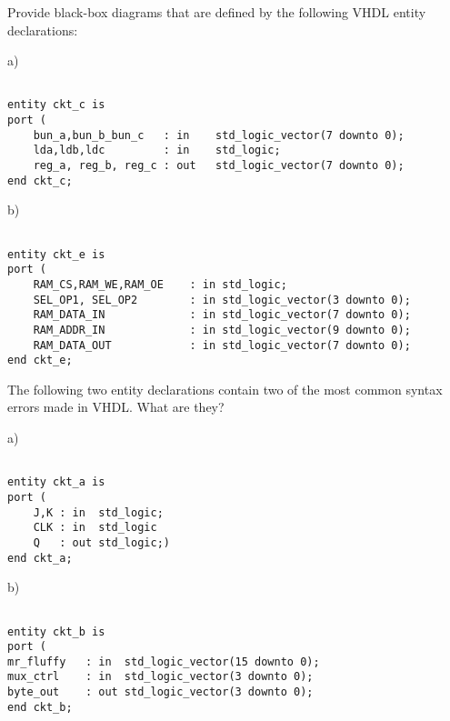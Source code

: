 \begin{my_num_list}
\item Provide black-box diagrams that are defined by the following VHDL entity declarations:

\noindent
\begin{minipage}{1\linewidth}
a)
\begin{lstlisting}[]

entity ckt_c is
port (
    bun_a,bun_b_bun_c   : in    std_logic_vector(7 downto 0);
    lda,ldb,ldc         : in    std_logic;
    reg_a, reg_b, reg_c : out   std_logic_vector(7 downto 0);
end ckt_c;
\end{lstlisting}
\end{minipage}

\noindent
\begin{minipage}{1\linewidth}
b)
\begin{lstlisting}[]

entity ckt_e is
port ( 
    RAM_CS,RAM_WE,RAM_OE    : in std_logic;
    SEL_OP1, SEL_OP2        : in std_logic_vector(3 downto 0);
    RAM_DATA_IN             : in std_logic_vector(7 downto 0);
    RAM_ADDR_IN             : in std_logic_vector(9 downto 0);
    RAM_DATA_OUT            : in std_logic_vector(7 downto 0);
end ckt_e;
\end{lstlisting}
\end{minipage}

\item The following two entity declarations contain two of the most common syntax errors made in VHDL. What are they?

\noindent
\begin{minipage}{1\linewidth}
a)
\begin{lstlisting}[framexrightmargin=-180pt]

entity ckt_a is
port (
    J,K : in  std_logic;
    CLK : in  std_logic
    Q   : out std_logic;)
end ckt_a;
\end{lstlisting}
\end{minipage}

\noindent
\begin{minipage}{1\linewidth}
b)
\begin{lstlisting}[framexrightmargin=-80pt, mathescape=true]

entity ckt_b is
port (
mr_fluffy   : in  std_logic_vector(15 downto 0);
mux_ctrl    : in  std_logic_vector(3 downto 0);
byte_out    : out std_logic_vector(3 downto 0);
end ckt_b;
\end{lstlisting}
\end{minipage}
\end{my_num_list}


